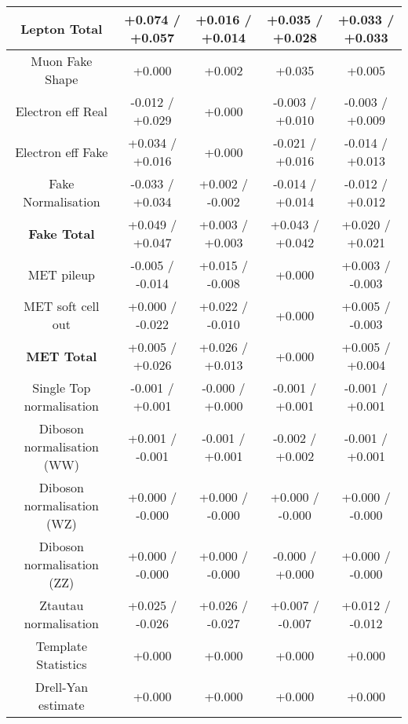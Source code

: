 \begin{table}[htbp]
\begin{center}
\begin{tabular}{|c|c|c|c|c|}
 \textbf{Lepton Total}                 &+0.074   / +0.057   & +0.016   / +0.014   & +0.035   / +0.028   & +0.033   / +0.033  \\
 \hline
 Muon Fake Shape                       &+0.000              & +0.002              & +0.035              & +0.005             \\
 Electron eff Real                     &-0.012   / +0.029   & +0.000              & -0.003   / +0.010   & -0.003   / +0.009  \\
 Electron eff Fake                     &+0.034   / +0.016   & +0.000              & -0.021   / +0.016   & -0.014   / +0.013  \\
 Fake Normalisation                    &-0.033   / +0.034   & +0.002   / -0.002   & -0.014   / +0.014   & -0.012   / +0.012  \\
 \hline
 \textbf{Fake Total}                   &+0.049   / +0.047   & +0.003   / +0.003   & +0.043   / +0.042   & +0.020   / +0.021  \\
 \hline
 MET pileup                            &-0.005   / -0.014   & +0.015   / -0.008   & +0.000              & +0.003   / -0.003  \\
 MET soft cell out                     &+0.000   / -0.022   & +0.022   / -0.010   & +0.000              & +0.005   / -0.003  \\
 \hline
 \textbf{MET Total}                    &+0.005   / +0.026   & +0.026   / +0.013   & +0.000              & +0.005   / +0.004  \\
 \hline
 Single Top normalisation              &-0.001   / +0.001   & -0.000   / +0.000   & -0.001   / +0.001   & -0.001   / +0.001  \\
 Diboson normalisation (WW)            &+0.001   / -0.001   & -0.001   / +0.001   & -0.002   / +0.002   & -0.001   / +0.001  \\
 Diboson normalisation (WZ)            &+0.000   / -0.000   & +0.000   / -0.000   & +0.000   / -0.000   & +0.000   / -0.000  \\
 Diboson normalisation (ZZ)            &+0.000   / -0.000   & +0.000   / -0.000   & -0.000   / +0.000   & +0.000   / -0.000  \\
 Ztautau normalisation                 &+0.025   / -0.026   & +0.026   / -0.027   & +0.007   / -0.007   & +0.012   / -0.012  \\
 Template Statistics                   &+0.000              & +0.000              & +0.000              & +0.000             \\
 Drell-Yan estimate                    &+0.000              & +0.000              & +0.000              & +0.000             \\

\end{tabular}
\end{center}
\end{table}
